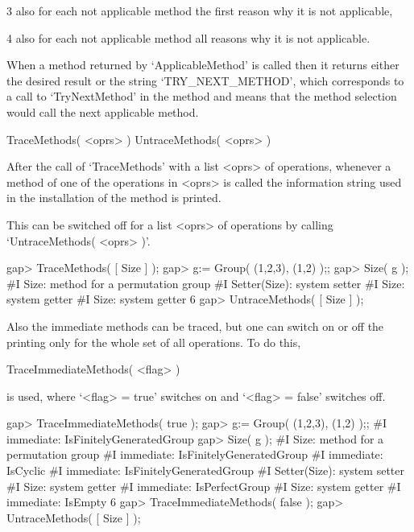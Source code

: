 \item{3}
    also for each not applicable method the first reason why it is not
    applicable,

\item{4}
    also for each not applicable method all reasons why it is not
    applicable.
\endlist

When a method returned by `ApplicableMethod' is called then
it returns either the desired result or the string `TRY_NEXT_METHOD',
which corresponds to a call to `TryNextMethod' in the method
and means that the method selection would call the next applicable
method.



\>TraceMethods( <oprs> )
\)UntraceMethods( <oprs> )

After the call of `TraceMethods' with a list <oprs> of operations,
whenever a method of one of the operations in <oprs> is called
the information string used in the installation of the method is printed.

This can be switched off for a list <oprs> of operations by calling
`UntraceMethods( <oprs> )'.

\beginexample
    gap> TraceMethods( [ Size ] );
    gap> g:= Group( (1,2,3), (1,2) );;
    gap> Size( g );
    #I  Size: method for a permutation group
    #I  Setter(Size): system setter
    #I  Size: system getter
    #I  Size: system getter
    6
    gap> UntraceMethods( [ Size ] );
\endexample

Also the immediate methods can be traced, but one can switch on or off
the printing only for the whole set of all operations.
To do this,

\>TraceImmediateMethods( <flag> )

is used, where `<flag> = true' switches on and `<flag> = false'
switches off.

\beginexample
    gap> TraceImmediateMethods( true );
    gap> g:= Group( (1,2,3), (1,2) );;
    #I  immediate: IsFinitelyGeneratedGroup
    gap> Size( g );
    #I  Size: method for a permutation group
    #I  immediate: IsFinitelyGeneratedGroup
    #I  immediate: IsCyclic
    #I  immediate: IsFinitelyGeneratedGroup
    #I  Setter(Size): system setter
    #I  Size: system getter
    #I  immediate: IsPerfectGroup
    #I  Size: system getter
    #I  immediate: IsEmpty
    6
    gap> TraceImmediateMethods( false );
    gap> UntraceMethods( [ Size ] );
\endexample

